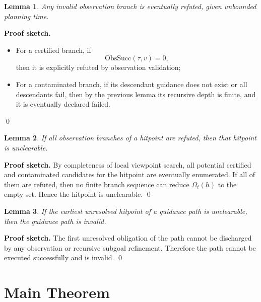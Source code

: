 \documentclass[11pt]{article}
\newtheorem{lemma}{Lemma}
\begin{document}
\begin{lemma}
Any invalid observation branch is eventually refuted, given unbounded planning time.
\end{lemma}

\noindent\textbf{Proof sketch.}
\begin{itemize}[leftmargin=2em]
    \item For a certified branch, if
    \[
    \mathrm{ObsSucc}(\tau,v)=0,
    \]
    then it is explicitly refuted by observation validation;
    \item For a contaminated branch, if its descendant guidance does not exist or all descendants fail, then by the previous lemma its recursive depth is finite, and it is eventually declared failed.
\end{itemize}
\qed

\begin{lemma}
If all observation branches of a hitpoint are refuted, then that hitpoint is unclearable.
\end{lemma}

\noindent\textbf{Proof sketch.}
By completeness of local viewpoint search, all potential certified and contaminated candidates for the hitpoint are eventually enumerated. If all of them are refuted, then no finite branch sequence can reduce $\Omega_t(h)$ to the empty set. Hence the hitpoint is unclearable. \qed

\begin{lemma}
If the earliest unresolved hitpoint of a guidance path is unclearable, then the guidance path is invalid.
\end{lemma}

\noindent\textbf{Proof sketch.}
The first unresolved obligation of the path cannot be discharged by any observation or recursive subgoal refinement. Therefore the path cannot be executed successfully and is invalid. \qed

\section{Main Theorem}
\end{document}
